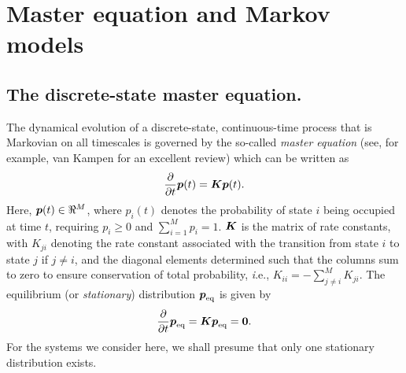 \section{Master equation and Markov models}
\label{validation:section:theory}

\subsection{The discrete-state master equation.}
\label{validation:section:master-equation-review}

The dynamical evolution of a discrete-state, continuous-time process that is Markovian on all timescales is governed by the so-called \emph{master equation} (see, for example, van Kampen \cite{vankampen} for an excellent review) which can be written as
\begin{equation}
\frac{\partial}{\partial t} {\mbox{\boldmath{$p$}}}(t) = {\mbox{\boldmath{$K$}}} {\mbox{\boldmath{$p$}}}(t) . \label{validation:equation:master-equation}
\end{equation}
Here, ${\mbox{\boldmath{$p$}}}(t) \in \Re^M$, where $p_i(t)$ denotes the probability of state $i$ being occupied at time $t$, requiring $p_i \ge 0$ and $\sum_{i=1}^M p_i = 1$.  
${\mbox{\boldmath{$K$}}}$ is the matrix of rate constants, with $K_{ji}$ denoting the rate constant associated with the transition from state $i$ to state $j$ if $j \ne i$, and the diagonal elements determined such that the columns sum to zero to ensure conservation of total probability, {\emph i.e.}, $K_{ii} = - \sum_{j \ne i}^M K_{ji}$.  
The equilibrium (or \emph{stationary}) distribution ${\mbox{\boldmath{$p$}}}_\mathrm{eq}$ is given by
\begin{equation}
\frac{\partial}{\partial t} {\mbox{\boldmath{$p$}}}_\mathrm{eq} = {\mbox{\boldmath{$K$}}} {\mbox{\boldmath{$p$}}}_\mathrm{eq} = {\mbox{\boldmath{$0$}}} .
\end{equation}
For the systems we consider here, we shall presume that only one stationary distribution exists.

